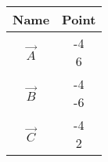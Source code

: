 \begin{tabular}[12pt]{ |c| c|}
    \hline
    \textbf{Name} & \textbf{Point}\\ 
    \hline
	$\vec{A}$ & \myvec{-4\\6}\\
    \hline 
	$\vec{B}$ & \myvec{-4\\-6}\\
    \hline
	$\vec{C}$ & \myvec{-4\\2}\\
    \hline
    \end{tabular}
